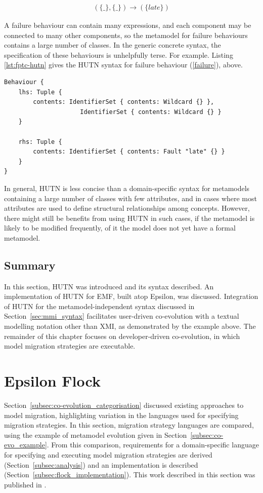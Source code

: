 \begin{eqnarray}\label{failure}
(\{\_\}, \{\_\}) \rightarrow (\{late\})
\end{eqnarray}


A failure behaviour can contain many expressions, and each component may be connected to many other components, so the metamodel for failure behaviours contains a large number of classes. In the generic concrete syntax, the specification of these behaviours is unhelpfully terse. For example. Listing \ref{lst:fptc-hutn} gives the HUTN syntax for failure behaviour (\ref{failure}), above.

\begin{lstlisting}[caption=Failure behaviour specified in HUTN., label=lst:fptc-hutn, language=FPTC]
Behaviour {
    lhs: Tuple {
        contents: IdentifierSet { contents: Wildcard {} },
                     IdentifierSet { contents: Wildcard {} }
    }

    rhs: Tuple {
        contents: IdentifierSet { contents: Fault "late" {} }
    }
}
\end{lstlisting}

In general, HUTN is less concise than a domain-specific syntax for metamodels containing a large number of classes with few attributes, and in cases where most attributes are used to define structural relationships among concepts. However, there might still be benefits from using HUTN in such cases, if the metamodel is likely to be modified frequently, of it the model does not yet have a formal metamodel.

\subsection{Summary}
In this section, HUTN was introduced and its syntax described. An implementation of HUTN for EMF, built atop Epsilon, was discussed. Integration of HUTN for the metamodel-independent syntax discussed in Section~\ref{sec:mmi_syntax} facilitates user-driven co-evolution with a textual modelling notation other than XMI, as demonstrated by the example above. The remainder of this chapter focuses on developer-driven co-evolution, in which model migration strategies are executable.


\section{Epsilon Flock}
\label{sec:flock}
Section~\ref{subsec:co-evolution_categorisation} discussed existing approaches to model migration, highlighting variation in the languages used for specifying migration strategies. In this section, migration strategy languages are compared, using the example of metamodel evolution given in Section~\ref{subsec:co-evo_example}. From this comparison, requirements for a domain-specific language for specifying and executing model migration strategies are derived (Section~\ref{subsec:analysis}) and an implementation is described (Section~\ref{subsec:flock_implementation}). This work described in this section was published in \cite{rose10flock}.


